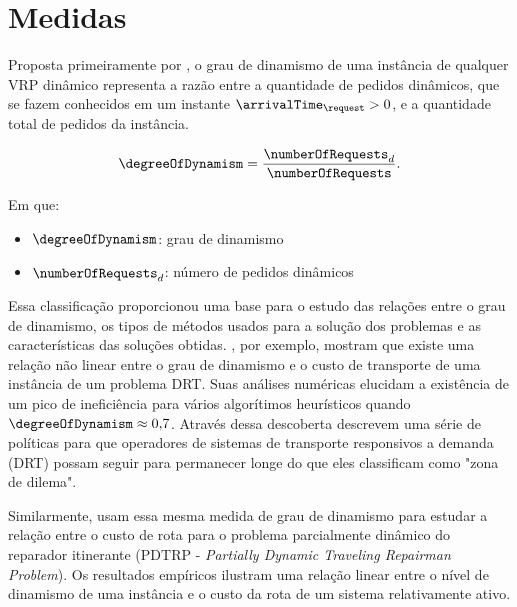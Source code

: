 \chapter{Medidas}\label{ch:medidas}



Proposta primeiramente por , o grau de dinamismo
de uma instância de qualquer VRP dinâmico representa a razão entre a quantidade
de pedidos dinâmicos, que se fazem conhecidos em um instante
$\arrivalTime_\request > 0$, e a quantidade total de pedidos da instância.

\begin{equation}
  \degreeOfDynamism = \frac{\numberOfRequests_{d}}{\numberOfRequests}.
  \label{eq:degreeOfDynamism}
\end{equation}

Em que:
\begin{itemize}
  \item $\degreeOfDynamism$: grau de dinamismo
  \item $\numberOfRequests_{d}$: número de pedidos dinâmicos
\end{itemize}

Essa classificação proporcionou uma base para o estudo das relações entre o 
grau de dinamismo, os tipos de métodos usados para a solução dos 
problemas e as características das soluções obtidas.
, por exemplo, mostram que existe uma relação não
linear entre o grau de dinamismo e o custo de transporte de uma instância de um
problema DRT.
Suas análises numéricas elucidam a existência de um pico de ineficiência para
vários algorítimos heurísticos quando $\degreeOfDynamism \approx 0{,}7$.
Através dessa descoberta  descrevem uma série de
políticas para que operadores de sistemas de transporte responsivos a demanda
(DRT) possam seguir para permanecer longe do que eles classificam como "zona de
dilema".

Similarmente,  usam essa mesma medida de 
grau de dinamismo para estudar a relação entre o custo de rota para o 
problema parcialmente dinâmico do reparador itinerante 
(PDTRP - \textit{Partially Dynamic Traveling Repairman Problem}).
Os resultados empíricos ilustram uma relação linear entre o nível de
dinamismo de uma instância e o custo da rota de um sistema relativamente ativo.

